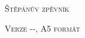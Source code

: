 ﻿
\vspace*{\fill}
\begin{center}
\begin{Huge}
\textsc{Štěpánův zpěvník}
\end{Huge}
\textsc{\linebreak\linebreak Verze {\the\year}-{\formatTwoDigits{\the\month}}-{\formatTwoDigits{\the\day}}, A5 formát}
\end{center}
\vspace*{\fill}

\pagebreak
